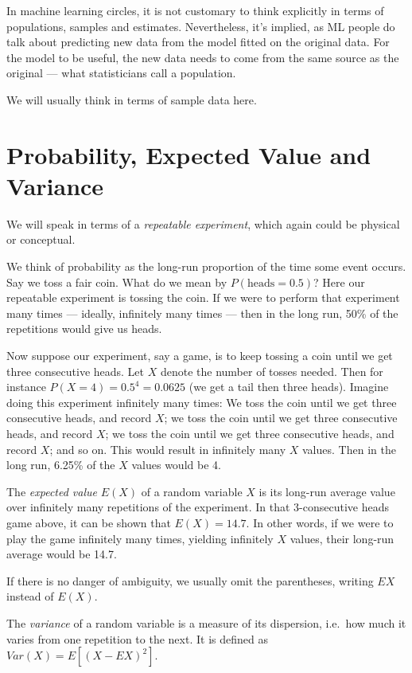 In machine learning circles, it is not customary to think explicitly in
terms of populations, samples and estimates.  Nevertheless, it's
implied, as ML people do talk about predicting new data from the model
fitted on the original data.  For the model to be useful, the new data
needs to come from the same source as the original --- what
statisticians call a population.

We will usually think in terms of sample data here.

\section{Probability, Expected Value and Variance}

We will speak in terms of a \textit{repeatable experiment}, which again
could be physical or conceptual.

We think of probability as the long-run proportion of the time some
event occurs.  Say we toss a fair coin.  What do we mean by
$P(\textrm{heads} = 0.5)$?  Here our repeatable experiment is tossing the
coin.  If we were to perform that experiment many times ---
ideally, infinitely many times --- then in the long run, 50\% of the
repetitions would give us heads.

Now suppose our experiment, say a game, is to keep tossing a coin until
we get three consecutive heads.  Let $X$ denote the number of tosses
needed.  Then for instance $P(X = 4) = 0.5^4 = 0.0625$ (we get a tail
then three heads).  Imagine doing this experiment infinitely many times:
We toss the coin until we get three consecutive heads, and record $X$;
we toss the coin until we get three consecutive heads, and record $X$;
we toss the coin until we get three consecutive heads, and record $X$;
and so on.  This would result in infinitely many $X$ values.  Then in
the long run, 6.25\% of the $X$ values would be 4.

The \textit{expected value} $E(X)$ of a random variable $X$ is its long-run
average value over infinitely many repetitions of the experiment.  In
that 3-consecutive heads game above, it can be shown that $E(X) = 14.7$.
In other words, if we were to play the game infinitely many times,
yielding infinitely $X$ values, their long-run average would be 14.7.

If there is no danger of ambiguity, we usually omit the parentheses,
writing $EX$ instead of $E(X)$.

The \textit{variance} of a random variable is a measure of its
dispersion, i.e.\ how much it varies from one repetition to the next.
It is defined as $Var(X) = E[(X - EX)^2]$.

